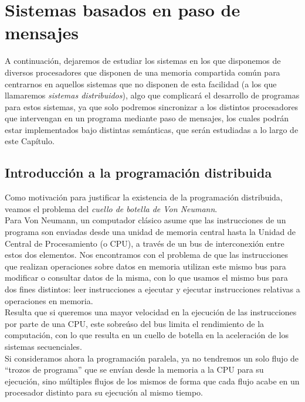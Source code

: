 \chapter{Sistemas basados en paso de mensajes}

A continuación, dejaremos de estudiar los sistemas en los que disponemos de diversos procesadores que disponen de una memoria compartida común para centrarnos en aquellos sistemas que no disponen de esta facilidad (a los que llamaremos \textit{sistemas distribuidos}), algo que complicará el desarrollo de programas para estos sistemas, ya que solo podremos sincronizar a los distintos procesadores que intervengan en un programa mediante paso de mensajes, los cuales podrán estar implementados bajo distintas semánticas, que serán estudiadas a lo largo de este Capítulo.

\section{Introducción a la programación distribuida}
Como motivación para justificar la existencia de la programación distribuida, veamos el problema del \textit{cuello de botella de Von Neumann}.\\

Para Von Neumann, un computador clásico asume que las instrucciones de un programa son enviadas desde una unidad de memoria central hasta la Unidad de Central de Procesamiento (o CPU), a través de un bus de interconexión entre estos dos elementos. Nos encontramos con el problema de que las instrucciones que realizan operaciones sobre datos en memoria utilizan este mismo bus para modificar o consultar datos de la misma, con lo que usamos el mismo bus para dos fines distintos: leer instrucciones a ejecutar y ejecutar instrucciones relativas a operaciones en memoria.\\

Resulta que si queremos una mayor velocidad en la ejecución de las instrucciones por parte de una CPU, este sobreúso del bus limita el rendimiento de la computación, con lo que resulta en un cuello de botella en la aceleración de los sistemas secuenciales.\\

Si consideramos ahora la programación paralela, ya no tendremos un solo flujo de ``trozos de programa''  que se envían desde la memoria a la CPU para su ejecución, sino múltiples flujos de los mismos de forma que cada flujo acabe en un procesador distinto para su ejecución al mismo tiempo.


